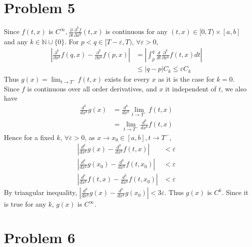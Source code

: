 \documentclass{report}
\def\ve{\varepsilon}
\def\abs#1{\left| #1 \right|}
\def\p{\partial}
\begin{document}
    \section*{Problem 5}
    Since $f(t, x)$ is $C^\infty, \frac{\p}{\p t} \frac{\p^k f}{\p x^k} (t, x)$ is 
    continuous for any $(t, x) \in [0, T) \times [a,b]$ and any $k \in \mathbb{N} \cup \{0\}$.
    For $p< q \in [T - \ve, T)$, $\forall \ve > 0$,
    \begin{align*}
        \abs{\frac{\p^k}{\p x^k}f(q, x) - \frac{\p^k}{\p x^k}f(p, x)} &= 
            \abs{\int_p^q \frac{d}{dt} \frac{\p^k}{\p x^k}f(t, x) dt}\\
            &\le \abs{q-p} C_k \le \ve C_k
    \end{align*} 
    Thus $g(x) = \lim_{t \to T^{-}} f(t,x)$ exists for every $x$ as it is the case for $k = 0$.
    Since $f$ is continuous over all order derivatives, and $x$ it independent of $t$, we also have
    \begin{align*}
        \frac{d^k}{dx^k}g(x) &= \frac{d^k}{dx^k} \lim_{t \to T^-} f(t, x) \\
            &= \lim_{t \to T^-} \frac{d^k}{dx^k} f(t, x)
    \end{align*}
    Hence for a fixed $k$, $\forall \ve > 0$, as $x \to x_0 \in [a, b], t \to T^-$,
    \begin{align*}
        \abs{\frac{d^k}{dx^k}g(x) - \frac{d^k}{dx^k} f(t, x)} &< \ve \\
        \abs{\frac{d^k}{dx^k}g(x_0) - \frac{d^k}{dx^k} f(t, x_0)} &< \ve \\
        \abs{\frac{d^k}{dx^k} f(t, x) - \frac{d^k}{dx^k} f(t, x_0)} &< \ve
    \end{align*}
    By triangular inequality, $\abs{\frac{d^k}{dx^k}g(x) - \frac{d^k}{dx^k}g(x_0)} < 3\ve$.
    Thus $g(x)$ is $C^k$. Since it is true for any $k$, $g(x)$ is $C^\infty$.

    \section*{Problem 6}
    
    
\end{document}
